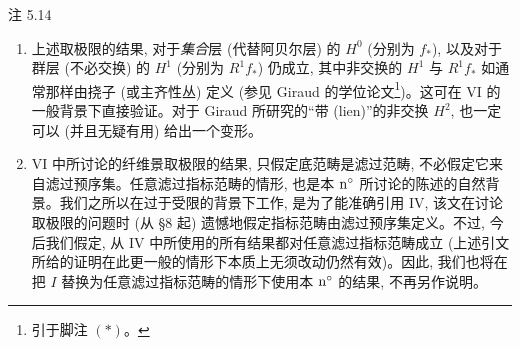 \begin{enonce*}[remark]{注 5.14}
\begin{enumerate}
\renewcommand{\theenumi}{\alph{enumi}}
\renewcommand{\labelenumi}{\theenumi)}
\item 上述\pageoriginale 取极限的结果, 对于\emph{集合}层 (代替阿贝尔层) 的 $H^{0}$ (分别为 $f_{\ast}$), 以及对于群层 (不必交换) 的 $H^{1}$ (分别为 $R^1 f_{\ast}$) 仍成立, 其中非交换的 $H^1$ 与 $R^1 f_{\ast}$ 如通常那样由挠子 (或主齐性丛) 定义 (参见 Giraud 的学位论文\footnote{引于脚注 $(\ast)$。})。这可在 VI 的一般背景下直接验证。对于 Giraud 所研究的“带 (lien)”的非交换 $H^2$, 也一定可以 (并且无疑有用) 给出一个变形。

\item VI 中所讨论的纤维景取极限的结果, 只假定底范畴是滤过范畴, 不必假定它来自滤过预序集。任意滤过指标范畴的情形, 也是本 ${\rm n^{\circ}}$ 所讨论的陈述的自然背景。我们之所以在过于受限的背景下工作, 是为了能准确引用 \EGA IV, 该文在讨论取极限的问题时 (从 §8 起) 遗憾地假定指标范畴由滤过预序集定义。不过, 今后我们假定, 从 \EGA IV 中所使用的所有结果都对任意滤过指标范畴成立 (上述引文所给的证明在此更一般的情形下本质上无须改动仍然有效)。因此, 我们也将在把 $I$ 替换为任意滤过指标范畴的情形下使用本 ${\rm n^{\circ}}$ 的结果, 不再另作说明。
\end{enumerate}
\end{enonce*}

\ifx\danslelivre\undefined

\fi



